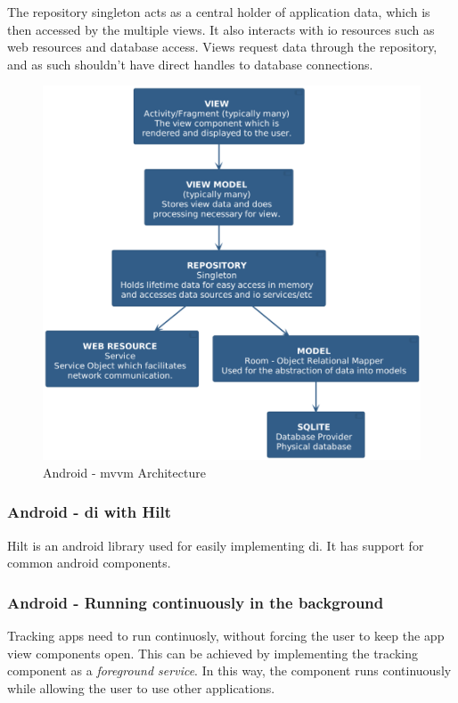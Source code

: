 The repository singleton acts as a central holder of application data, which is then accessed by the multiple views. It also interacts with \ac{io} resources such as web resources and database access. Views request data through the repository, and as such shouldn't have direct handles to database connections. \cite{noauthor_guide_nodate}

\begin{figure}
\centering
\includegraphics[scale=0.4]{../diag/mvvm_layout.png}
\caption{Android - \Ac{mvvm} Architecture}
\label{fig:mvvm_layout}
\end{figure}

\subsubsection{Android - \ac{di} with Hilt}
Hilt is an android library used for easily implementing \ac{di}.
It has support for common android components.
\cite{noauthor_dependency_nodate}

\subsubsection{Android - Running continuously in the background}
Tracking \ac{app}s need to run continuosly, without forcing the user to keep the \ac{app} view components open.
This can be achieved by implementing the tracking component as a \textit{foreground service}.
In this way, the component runs continuously while allowing the user to use other applications.

